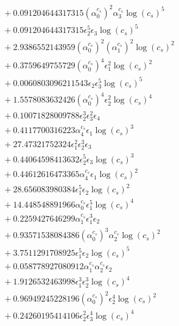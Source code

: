 \documentclass[10pt]{article}
\begin{document}
\begin{align*}
&{}  + 0.091204644317315 \left(\alpha_{0}^{c_s}\right)^{2} \alpha_{3}^{c_s} \log{\left(c_{s} \right)}^{5} \\
&{}  + 0.091204644317315 \epsilon_{2}^{5} \epsilon_{3} \log{\left(c_{s} \right)}^{5} \\
&{}  + 2.9386552143959 \left(\alpha_{0}^{c_s}\right)^{2} \left(\alpha_{1}^{c_s}\right)^{2} \log{\left(c_{s} \right)}^{2} \\
&{}  + 0.3759649755729 \left(\alpha_{0}^{c_s}\right)^{4} \epsilon_{1}^{2} \log{\left(c_{s} \right)}^{2} \\
&{}  + 0.0060803096211543 \epsilon_{2} \epsilon_{3}^{5} \log{\left(c_{s} \right)}^{5} \\
&{}  + 1.5578083632426 \left(\alpha_{0}^{c_s}\right)^{4} \epsilon_{2}^{2} \log{\left(c_{s} \right)}^{4} \\
&{}  + 0.10071828009788 \epsilon_{2}^{3} \epsilon_{3}^{2} \epsilon_{4} \\
&{}  + 0.4117700316223 \alpha_{4}^{c_s} \epsilon_{1} \log{\left(c_{s} \right)}^{3} \\
&{}  + 27.47321752324 \epsilon_{1}^{2} \epsilon_{2}^{3} \epsilon_{3} \\
&{}  + 0.44064598413632 \epsilon_{2}^{5} \epsilon_{3} \log{\left(c_{s} \right)}^{3} \\
&{}  + 0.44612616473365 \alpha_{4}^{c_s} \epsilon_{1} \log{\left(c_{s} \right)}^{2} \\
&{}  + 28.656083980384 \epsilon_{1}^{5} \epsilon_{2} \log{\left(c_{s} \right)}^{2} \\
&{}  + 14.448548891966 \alpha_{0}^{c_s} \epsilon_{1}^{5} \log{\left(c_{s} \right)}^{4} \\
&{}  + 0.2259427646299 \alpha_{1}^{c_s} \epsilon_{1}^{3} \epsilon_{2} \\
&{}  + 0.93571538084386 \left(\alpha_{0}^{c_s}\right)^{3} \alpha_{2}^{c_s} \log{\left(c_{s} \right)}^{2} \\
&{}  + 3.7511291708925 \epsilon_{1}^{5} \epsilon_{2} \log{\left(c_{s} \right)}^{5} \\
&{}  + 0.058778927080912 \alpha_{1}^{c_s} \alpha_{2}^{c_s} \epsilon_{2} \\
&{}  + 1.9126532463998 \epsilon_{1}^{3} \epsilon_{2}^{3} \log{\left(c_{s} \right)}^{4} \\
&{}  + 0.96949245228196 \left(\alpha_{0}^{c_s}\right)^{2} \epsilon_{2}^{4} \log{\left(c_{s} \right)}^{2} \\
&{}  + 0.24260195414106 \epsilon_{2}^{2} \epsilon_{3}^{4} \log{\left(c_{s} \right)}^{4} \\

\end{align*}
\end{document}
